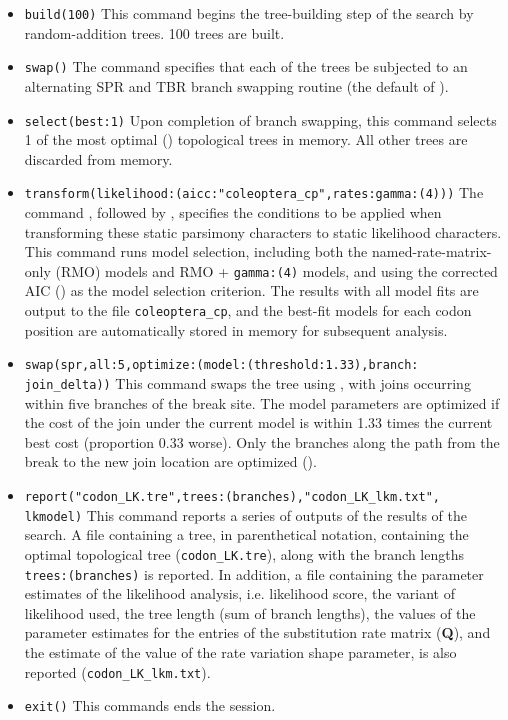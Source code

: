 \begin{itemize}
\item \texttt{build(100)} This command begins the tree-building
step of the search by random-addition trees. 100 trees are built.
\item \texttt{swap()} The  command specifies that
each of the trees be subjected to an alternating SPR and TBR branch
swapping routine (the default of \poy).  
\item \texttt{select(best:1)}
Upon completion of branch swapping, this command selects 1 of the
most optimal () topological trees in memory. All
other trees are discarded from memory.  
\item \texttt{transform(likelihood:(aicc:"coleoptera\_cp",rates:gamma:(4)))} The
command , followed by ,
specifies the conditions to be applied when transforming these
static parsimony characters to static likelihood characters. This
command runs model selection, including both the named-rate-matrix-only
(RMO) models and RMO + \texttt{gamma:(4)} models, and using the corrected
AIC () as the model selection criterion. The
results with all model fits are output to the file \texttt{coleoptera\_cp},
and the best-fit models for each codon position are automatically
stored in memory for subsequent analysis.  
\item \texttt{swap(spr,all:5,optimize:(model:(threshold:1.33),branch: \\
join\_delta))} This command swaps the tree using ,
with joins occurring within five branches of the break site. The
model parameters are optimized if the cost of the join under the
current model is within 1.33 times the current best cost (proportion
0.33 worse).  Only the branches along the path from the break to
the new join location are optimized ().
\item \texttt{report("codon\_LK.tre",trees:(branches),"codon\_LK\_lkm.txt",\\
lkmodel)} This command reports a series of outputs of the results
of the search.  A file containing a tree, in parenthetical notation,
containing the optimal topological tree (\texttt{codon\_LK.tre}),
along with the branch lengths \texttt{trees:(branches)} is reported.
In addition, a file containing the parameter estimates of the
likelihood analysis, i.e. likelihood score, the variant of likelihood
used, the tree length (sum of branch lengths), the values of the
parameter estimates for the entries of the substitution rate matrix
(\textbf{Q}), and the estimate of the value of the rate variation
shape parameter, is also reported (\texttt{codon\_LK\_lkm.txt}).
\item \texttt{exit()} This commands ends the \poy session.

\end{itemize}

